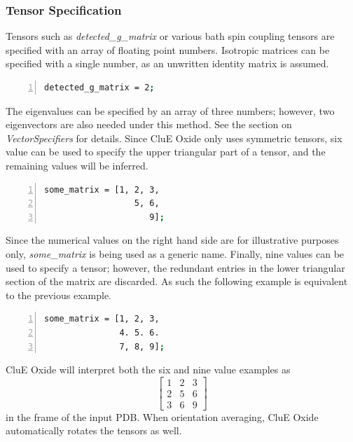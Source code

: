 \documentclass{book}
\begin{document}
\subsubsection{Tensor Specification} %
Tensors such as \textit{detected\_g\_matrix} or various bath spin
coupling tensors are specified with an array of floating point numbers.
Isotropic matrices can be specified with a single number, as an unwritten 
identity matrix is assumed.
\begin{lstlisting}[frame=single,numbers=left,language=bash]
detected_g_matrix = 2;
\end{lstlisting}
The eigenvalues can be specified by an array of three numbers; however, 
two eigenvectors are also needed under this method.  
See the section on \textit{VectorSpecifiers} for details.
Since  CluE Oxide only uses symmetric tensors, 
six value can be used to specify the upper triangular part of a tensor,
and the remaining values will be inferred.
\begin{lstlisting}[frame=single,numbers=left,language=bash]
some_matrix = [1, 2, 3,
                  5, 6,
                     9];
\end{lstlisting}
Since the numerical values on the right hand side are for illustrative 
purposes only, \textit{some\_matrix} is being used as a generic name.
Finally, nine values can be used to specify a tensor; however, the redundant 
entries in the lower triangular section of the matrix are discarded.  
As such the following example is equivalent to the previous example.
\begin{lstlisting}[frame=single,numbers=left,language=bash]
some_matrix = [1, 2, 3,
               4. 5. 6.
               7, 8, 9];
\end{lstlisting}
CluE Oxide will interpret both the six and nine value examples as
\begin{equation*}
\begin{bmatrix}
1 & 2 & 3 \\
2 & 5 & 6 \\
3 & 6 & 9
\end{bmatrix}
\end{equation*}
in the frame of the input PDB.  
When orientation averaging, CluE Oxide automatically rotates the tensors as 
well.
\end{document}
